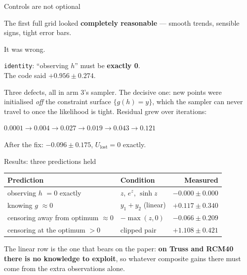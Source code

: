 \documentclass[aspectratio=169,11pt]{beamer}
\newcommand{\Ulost}{U_{\text{lost}}}
\newcommand{\good}{\textcolor{green!50!black}}
\newcommand{\bad}{\textcolor{red!70!black}}
\begin{document}
\begin{frame}{Controls are not optional}

The first full grid looked \textbf{completely reasonable} --- smooth trends,
sensible signs, tight error bars.

\medskip
It was wrong.

\bigskip
\begin{center}
\texttt{identity}: ``observing $h$'' must be \textbf{exactly 0}.\\[4pt]
The code said \bad{$\mathbf{+0.956 \pm 0.274}$}.
\end{center}

\bigskip
Three defects, all in arm 3's sampler. The decisive one: new points were
initialised \emph{off} the constraint surface $\{g(h)=y\}$, which the sampler can
never travel to once the likelihood is tight. Residual grew over iterations:

\begin{center}
\small
$0.0001 \to 0.004 \to 0.027 \to 0.019 \to 0.043 \to \mathbf{0.121}$
\end{center}

\bigskip
After the fix: \good{$-0.096 \pm 0.175$}, $\Ulost = 0$ exactly.

\end{frame}

\begin{frame}{Results: three predictions held}

\begin{center}
\begin{tabular}{llr}
\toprule
Prediction & Condition & Measured \\
\midrule
observing $h$ $=0$ exactly & $z$, $e^z$, $\sinh z$ & \good{$-0.000\pm0.000$} \\
knowing $g$ $\approx0$ & $y_1+y_2$ (linear) & \good{$+0.117\pm0.340$} \\
censoring away from optimum $\approx0$ & $-\max(z,0)$ & \good{$-0.066\pm0.209$} \\
censoring at the optimum $>0$ & clipped pair & \good{$+1.108\pm0.421$} \\
\bottomrule
\end{tabular}
\end{center}

\bigskip
The linear row is the one that bears on the paper: \textbf{on Truss and RCM40
there is no knowledge to exploit}, so whatever composite gains there must come
from the extra observations alone.

\end{frame}
\end{document}
